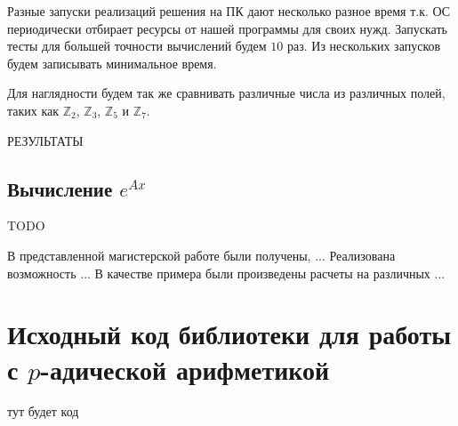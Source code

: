 \documentclass[master, och, diploma, times]{sty/SCWorks}
\theoremstyle{plain}
\theoremstyle{definition}
\begin{document}
Разные запуски реализаций решения на ПК дают несколько разное время т.к. ОС периодически отбирает ресурсы от нашей программы для своих нужд. Запускать тесты для большей точности вычислений будем $10$ раз. Из нескольких запусков будем записывать минимальное время.

Для наглядности будем так же сравнивать различные числа из различных полей, таких как $\mathbb{Z}_2$, $\mathbb{Z}_3$, $\mathbb{Z}_5$ и $\mathbb{Z}_7$.



РЕЗУЛЬТАТЫ



\subsection{Вычисление $e^{Ax}$}

TODO
 

\conclusion
В представленной магистерской работе были получены, ...
Реализована возможность ...
В качестве примера были произведены расчеты на различных ...




\appendix

\section{Исходный код библиотеки для работы с $p$-адической арифметикой}

тут будет код
\end{document}
